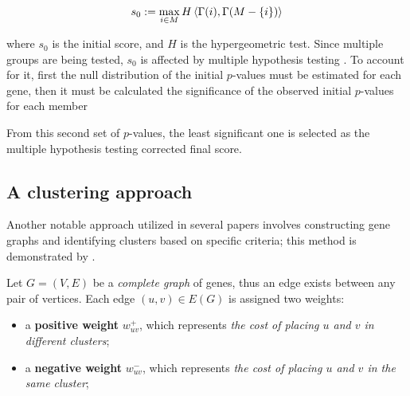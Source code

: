 \begin{equation}
    s_0 := \max_{i \in M} {H \left\langle\Gamma(i), \Gamma(M - \{i\})\right\rangle}
\end{equation}

where $s_0$ is the initial score, and $H$ is the hypergeometric test. Since multiple groups are being tested, $s_0$ is affected by multiple hypothesis testing . To account for it, first the null distribution of the initial $p$-values must be estimated for each gene, then it must be calculated the significance of the observed initial $p$-values for each member 

From this second set of $p$-values, the least significant one is selected as the multiple hypothesis testing corrected final score. 

\subsection{A clustering approach} \label{c3_chap2}

Another notable approach utilized in several papers involves constructing gene graphs and identifying clusters based on specific criteria; this method is demonstrated by \textcite{c3}.

Let $G = (V, E)$ be a \textit{complete graph} of genes, thus an edge exists between any pair of vertices. Each edge $(u, v) \in E(G)$ is assigned two weights:

\begin{itemize}
    \item a \textbf{positive weight} $w_{uv}^+$, which represents \textit{the cost of placing $u$ and $v$ in different clusters};
    \item a \textbf{negative weight} $w_{uv}^-$, which represents \textit{the cost of placing $u$ and $v$ in the same cluster};
\end{itemize}

